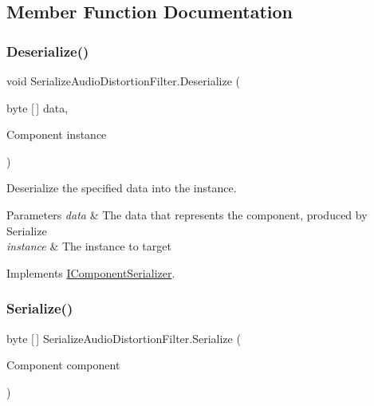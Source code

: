 \subsection{Member Function Documentation}
\mbox{\label{class_serialize_audio_distortion_filter_ac48265d0fbc0547e5d316f09828ca086}} 
\subsubsection{\texorpdfstring{Deserialize()}{Deserialize()}}
{\footnotesize\ttfamily void Serialize\+Audio\+Distortion\+Filter.\+Deserialize (\begin{DoxyParamCaption}\item[{byte \mbox{[}$\,$\mbox{]}}]{data,  }\item[{Component}]{instance }\end{DoxyParamCaption})\hspace{0.3cm}{\ttfamily [inline]}}



Deserialize the specified data into the instance. 


\begin{DoxyParams}{Parameters}
{\em data} & The data that represents the component, produced by Serialize \\
\hline
{\em instance} & The instance to target \\
\hline
\end{DoxyParams}


Implements \hyperlink{interface_i_component_serializer_a4cc366a5c78b33d47a90c209d8fed883}{I\+Component\+Serializer}.

\mbox{\label{class_serialize_audio_distortion_filter_a035cc0e02b72b00fdc39d0fbfe5c2b96}} 
\subsubsection{\texorpdfstring{Serialize()}{Serialize()}}
{\footnotesize\ttfamily byte \mbox{[}$\,$\mbox{]} Serialize\+Audio\+Distortion\+Filter.\+Serialize (\begin{DoxyParamCaption}\item[{Component}]{component }\end{DoxyParamCaption})\hspace{0.3cm}{\ttfamily [inline]}}



